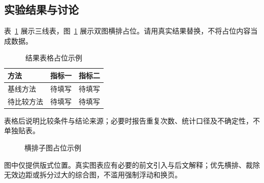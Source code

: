 \subsection{实验结果与讨论}
表~\ref{tab:example} 展示三线表，图~\ref{fig:example} 展示双图横排占位。请用真实结果替换，不将占位内容当成数据。
\begin{table}[htbp]
\centering\wuhao
\caption{结果表格占位示例}\label{tab:example}
\begin{tabular}{lll}
\toprule[1.5pt]
方法 & 指标一 & 指标二\\
\midrule[1pt]
基线方法 & 待填写 & 待填写\\
待比较方法 & 待填写 & 待填写\\
\bottomrule[1.5pt]
\end{tabular}
\end{table}
表格后说明比较条件与结论来源；必要时报告重复次数、统计口径及不确定性，不单独贴表。

\begin{figure}[htbp]
\centering
\hfill
{}
\caption{横排子图占位示例}\label{fig:example}
\end{figure}
图中仅提供版式位置。真实图表应有必要的前文引入与后文解释；优先横排、裁除无效边距或拆分过大的综合图，不滥用强制浮动和换页。
